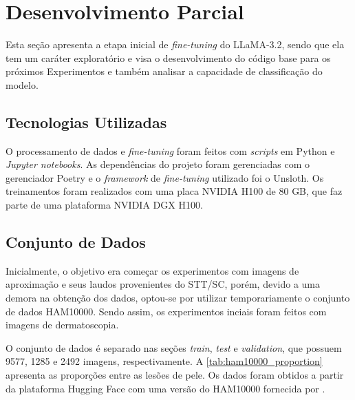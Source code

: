 \chapter{Desenvolvimento Parcial} %

Esta seção apresenta a etapa inicial de \textit{fine-tuning} do \ac{LLaMA}-3.2, sendo que ela tem um caráter exploratório e visa o desenvolvimento do código base para
os próximos Experimentos e também analisar a capacidade de classificação do modelo.

\section{Tecnologias Utilizadas}

O processamento de dados e \textit{fine-tuning} foram feitos com \textit{scripts} em Python e \textit{Jupyter notebooks}. As dependências do projeto foram gerenciadas
com o gerenciador Poetry e o \textit{framework} de \textit{fine-tuning} utilizado foi o Unsloth. Os treinamentos foram realizados com uma placa NVIDIA H100 de 80 GB, que
faz parte de uma plataforma NVIDIA DGX H100.

\section{Conjunto de Dados}

Inicialmente, o objetivo era começar os experimentos com imagens de aproximação e seus laudos provenientes do \ac{STT/SC}, porém, devido a uma demora na obtenção dos
dados, optou-se por utilizar temporariamente o conjunto de dados \ac{HAM10000}. Sendo assim, os experimentos inciais foram feitos com imagens de dermatoscopia.

O conjunto de dados é separado nas seções \textit{train}, \textit{test} e \textit{validation}, que possuem 9577, 1285 e 2492 imagens, respectivamente. A
\autoref{tab:ham10000_proportion} apresenta as proporções entre as lesões de pele. Os dados foram obtidos a partir da plataforma Hugging Face com uma versão do
\ac{HAM10000} fornecida por \textcite{skin_cancer_dataset}.

